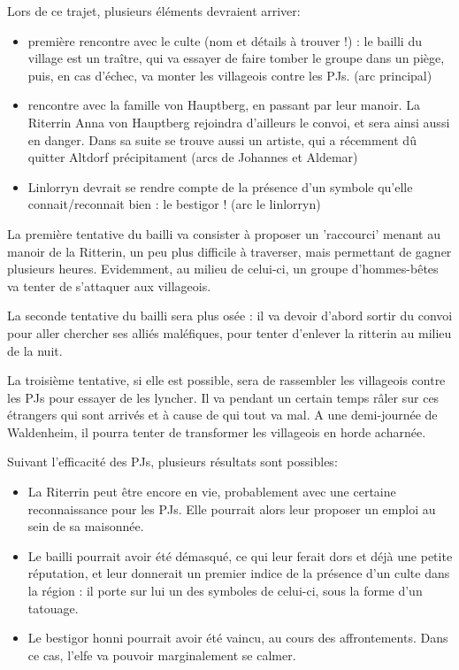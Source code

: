 \documentclass[10pt,a4paper]{book}
\begin{document}
Lors de ce trajet, plusieurs éléments devraient arriver:
\begin{itemize}
\item première rencontre avec le culte (nom et détails à trouver !) : le bailli du village est un traître, qui va essayer de faire tomber le groupe dans un piège, puis, en cas d'échec, va monter les villageois contre les PJs. (arc principal)
\item rencontre avec la famille von Hauptberg, en passant par leur manoir. La Riterrin Anna von Hauptberg rejoindra d'ailleurs le convoi, et sera ainsi aussi en danger. Dans sa suite se trouve aussi un artiste, qui a récemment dû quitter Altdorf précipitament (arcs de Johannes et Aldemar)
\item Linlorryn devrait se rendre compte de la présence d'un symbole qu'elle connait/reconnait bien : le bestigor ! (arc le linlorryn)
\end{itemize}

La première tentative du bailli va consister à proposer un 'raccourci' menant au manoir de la Ritterin, un peu plus difficile à traverser, mais permettant de gagner plusieurs heures. Evidemment, au milieu de celui-ci, un groupe d'hommes-bêtes va tenter de s'attaquer aux villageois.

La seconde tentative du bailli sera plus osée : il va devoir d'abord sortir du convoi pour aller chercher ses alliés maléfiques, pour tenter d'enlever la ritterin au milieu de la nuit.

La troisième tentative, si elle est possible, sera de rassembler les villageois contre les PJs pour essayer de les lyncher. Il va pendant un certain temps râler sur ces étrangers qui sont arrivés et à cause de qui tout  va mal. A une demi-journée de Waldenheim, il pourra tenter de transformer les villageois en horde acharnée.

Suivant l'efficacité des PJs, plusieurs résultats sont possibles:
\begin{itemize}
\item La Riterrin peut être encore en vie, probablement avec une certaine reconnaissance pour les PJs. Elle pourrait alors leur proposer un emploi au sein de sa maisonnée.
\item Le bailli pourrait avoir été démasqué, ce qui leur ferait dors et déjà une petite réputation, et leur donnerait un premier indice de la présence d'un culte dans la région : il porte sur lui un des symboles de celui-ci, sous la forme d'un tatouage.
\item Le bestigor honni pourrait avoir été vaincu, au cours des affrontements. Dans ce cas, l'elfe va pouvoir marginalement se calmer.
\end{itemize}
\end{document}
